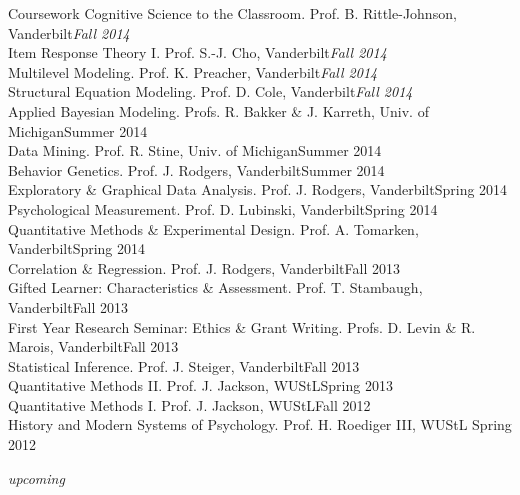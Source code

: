 \documentclass {resume}
\begin{document}
\begin{rSection}{\textrm{Coursework}}
Cognitive Science to the Classroom. Prof. B. Rittle-Johnson, Vanderbilt\hfill  {\textit{Fall 2014}}\smallskip\\
Item Response Theory \textrm{I}. Prof. S.-J. Cho, Vanderbilt\hfill  {\textit{Fall 2014}}\smallskip\\
Multilevel Modeling. Prof. K. Preacher, Vanderbilt\hfill  {\textit{Fall 2014}}\smallskip\\
Structural Equation Modeling. Prof. D. Cole, Vanderbilt\hfill  {\textit{Fall 2014}}\smallskip\\%
Applied Bayesian Modeling. Profs. R. Bakker \& J. Karreth, Univ. of Michigan\hfill  {Summer 2014}\smallskip\\
Data Mining. Prof. R. Stine, Univ. of Michigan\hfill  {Summer 2014}\smallskip\\
Behavior Genetics. Prof. J. Rodgers, Vanderbilt\hfill  {Summer 2014}\smallskip\\
Exploratory \& Graphical Data Analysis. Prof. J. Rodgers, Vanderbilt\hfill  {Spring 2014}\smallskip\\
Psychological Measurement. Prof. D. Lubinski, Vanderbilt\hfill  {Spring 2014}\smallskip\\
Quantitative Methods \& Experimental Design. Prof. A. Tomarken, Vanderbilt\hfill  {Spring 2014}\smallskip\\
Correlation \& Regression. Prof. J. Rodgers, Vanderbilt\hfill  {Fall 2013}\smallskip\\
Gifted Learner: Characteristics \& Assessment. Prof. T. Stambaugh, Vanderbilt\hfill  {Fall 2013}\smallskip\\
First Year Research Seminar: Ethics \& Grant Writing. Profs. D. Levin \& R. Marois, Vanderbilt\hfill  {Fall 2013}\smallskip\\
Statistical Inference. Prof. J. Steiger, Vanderbilt\hfill  {Fall 2013}\smallskip\\
Quantitative Methods \textrm{II}. Prof. J. Jackson, WUStL\hfill  {Spring 2013}\smallskip\\
Quantitative Methods \textrm{I}. Prof. J. Jackson, WUStL\hfill  {Fall 2012}\smallskip\\
History and Modern Systems of Psychology. Prof. H. Roediger \textrm{III}, WUStL \hfill  {Spring 2012}\vspace{-2mm}\begin{center}\footnotesize{ \textit{upcoming}%
}\end{center} \vspace{-4mm}
\end{rSection}
\end{document}
